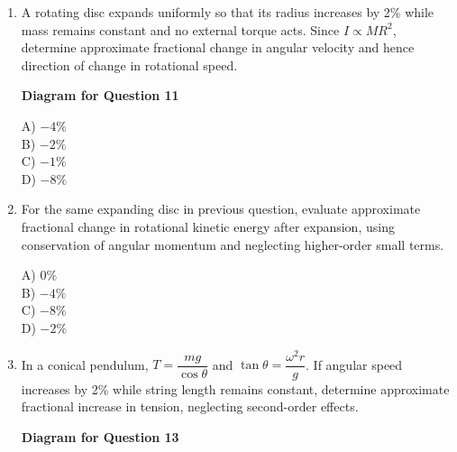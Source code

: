 \documentclass[12pt]{article}
\begin{document}
\begin{enumerate}
\item A rotating disc expands uniformly so that its radius increases by 2\% while mass remains constant and no external torque acts. Since $I\propto MR^2$, determine approximate fractional change in angular velocity and hence direction of change in rotational speed.

\begin{center}
\textbf{Diagram for Question 11}
\end{center}

A) $-4\%$ \\
B) $-2\%$ \\
C) $-1\%$ \\
D) $-8\%$

\item For the same expanding disc in previous question, evaluate approximate fractional change in rotational kinetic energy after expansion, using conservation of angular momentum and neglecting higher-order small terms.

A) $0\%$ \\
B) $-4\%$ \\
C) $-8\%$ \\
D) $-2\%$

\item In a conical pendulum, $T=\dfrac{mg}{\cos\theta}$ and $\tan\theta=\dfrac{\omega^2 r}{g}$. If angular speed increases by 2\% while string length remains constant, determine approximate fractional increase in tension, neglecting second-order effects.

\begin{center}
\textbf{Diagram for Question 13}
\end{center}


\end{enumerate}
\end{document}
